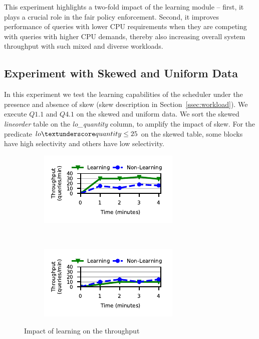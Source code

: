 This experiment highlights a two-fold impact of the learning module -- first, it plays a crucial role in the fair policy enforcement. 
Second, it improves performance of queries with lower CPU requirements when they are competing with queries with higher CPU demands, thereby also increasing overall system throughput with such mixed and diverse workloads. 

\subsection{Experiment with Skewed and Uniform Data}
In this experiment we test the learning capabilities of the \sys{} scheduler under the presence and absence of skew (skew description in Section~\ref{ssec:workload}).
We execute $Q1.1$ and $Q4.1$ on the skewed and uniform data.
We sort the skewed \textit{lineorder} table on the \textit{lo\_quantity} column, to amplify the impact of skew. 
For the predicate $lo\textunderscore quantity \leq 25$ on the skewed table, some blocks have high selectivity and others have low selectivity.


\begin{figure}[t]
	\centering
    \begin{subfigure}[b]{0.3\textwidth}
    	\includegraphics[width=\textwidth]{policy/figures/q11-throughput.pdf}
    \end{subfigure}%
    ~
    \begin{subfigure}[b]{0.3\textwidth}
    	\includegraphics[width=\textwidth]{policy/figures/q41-throughput.pdf}
    \end{subfigure}%
	\caption{Impact of learning on the throughput}
	\label{fig:q11-q41-throughput}
\end{figure}
	
